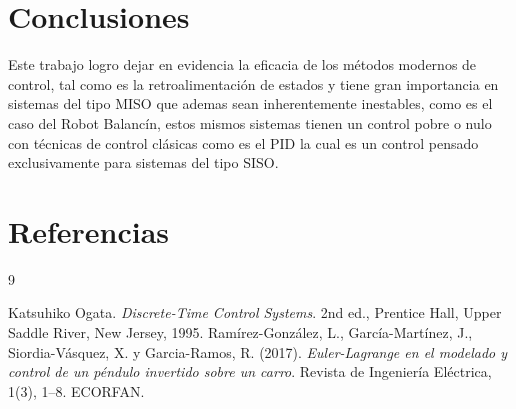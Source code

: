 \documentclass[final,times,twocolumn,5p]{ResumenEjecutivo}
\begin{document}
\section{Conclusiones}
Este trabajo logro dejar en evidencia la eficacia de los métodos modernos de control, tal como es la retroalimentación de estados y tiene gran importancia en sistemas del tipo MISO que ademas sean inherentemente inestables, como es el caso del Robot Balancín, estos mismos sistemas tienen un control pobre o nulo con técnicas de control clásicas como es el PID la cual es un control pensado exclusivamente para sistemas del tipo SISO. 

\section{Referencias}
\begin{normalsize}
\begin{thebibliography}{9}

Katsuhiko Ogata.
\textit{Discrete-Time Control Systems}.
2nd ed., Prentice Hall, Upper Saddle River, New Jersey, 1995.
Ramírez-González, L., García-Martínez, J., Siordia-Vásquez, X. y Garcia-Ramos, R. (2017).
\textit{Euler-Lagrange en el modelado y control de un péndulo invertido sobre un carro}.
Revista de Ingeniería Eléctrica, 1(3), 1–8. ECORFAN.
\end{thebibliography}
\end{normalsize}
\end{document}
